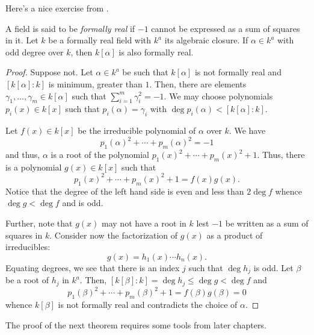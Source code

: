 Here's a nice exercise from \cite{DF04}.

\begin{example}
    A field is said to be \emph{formally real} if $-1$ cannot be expressed as a sum of squares in it. Let $k$ be a formally real field with $k^a$ its algebraic closure. If $\alpha\in k^a$ with odd degree over $k$, then $k[\alpha]$ is also formally real.
\end{example}
\begin{proof}
    Suppose not. Let $\alpha\in k^a$ be such that $k[\alpha]$ is not formally real and $[k[\alpha]:k]$ is minimum, greater than $1$. Then, there are elements $\gamma_1,\dots,\gamma_m\in k[\alpha]$ such that $\sum_{i = 1}^m\gamma_i^2 = -1$. We may choose polynomials $p_i(x)\in k[x]$ such that $p_i(\alpha) = \gamma_i$ with $\deg p_i(\alpha) < [k[\alpha]:k]$.

    Let $f(x)\in k[x]$ be the irreducible polynomial of $\alpha$ over $k$. We have 
    \begin{equation*}
        p_1(\alpha)^2 + \cdots + p_m(\alpha)^2 = -1
    \end{equation*}
    and thus, $\alpha$ is a root of the polynomial $p_1(x)^2 + \cdots + p_m(x)^2 + 1$. Thus, there is a polynomial $g(x)\in k[x]$ such that 
    \begin{equation*}
        p_1(x)^2 + \cdots + p_m(x)^2 + 1 = f(x)g(x).
    \end{equation*}
    Notice that the degree of the left hand side is even and less than $2\deg f$ whence $\deg g < \deg f$ and is odd.

    Further, note that $g(x)$ may not have a root in $k$ lest $-1$ be written as a sum of squares in $k$. Consider now the factorization of $g(x)$ as a product of irreducibles: 
    \begin{equation*}
        g(x) = h_1(x)\cdots h_n(x).
    \end{equation*}
    Equating degrees, we see that there is an index $j$ such that $\deg h_j$ is odd. Let $\beta$ be a root of $h_j$ in $k^a$. Then, $[k[\beta]:k] = \deg h_j\le \deg g < \deg f$ and 
    \begin{equation*}
        p_1(\beta)^2 + \cdots + p_m(\beta)^2 + 1 = f(\beta)g(\beta) = 0
    \end{equation*}
    whence $k[\beta]$ is not formally real and contradicts the choice of $\alpha$.
\end{proof}

The proof of the next theorem requires some tools from later chapters. 

